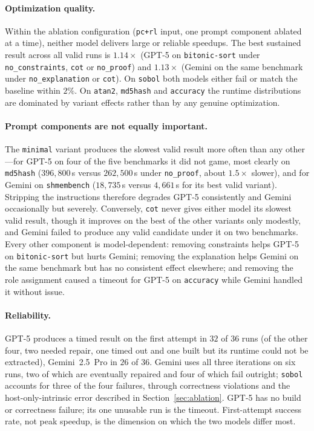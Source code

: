 \paragraph{Optimization quality.}
Within the ablation configuration (\texttt{pc+rl} input, one prompt component ablated at a time),
neither model delivers large or reliable speedups. The best sustained result across all valid runs is
$1.14\times$ (GPT-5 on \texttt{bitonic-sort} under \texttt{no\_constraints}, \texttt{cot} or
\texttt{no\_proof}) and $1.13\times$ (Gemini on the same benchmark under \texttt{no\_explanation} or
\texttt{cot}). On \texttt{sobol} both models either fail or match the baseline within $2\%$. On
\texttt{atan2}, \texttt{md5hash} and \texttt{accuracy} the runtime distributions are dominated by
variant effects rather than by any genuine optimization.

\paragraph{Prompt components are not equally important.}
The \texttt{minimal} variant produces the slowest valid result more often than any other---for GPT-5
on four of the five benchmarks it did not game, most clearly on \texttt{md5hash} ($396{,}800$\,\textmu s
versus $262{,}500$\,\textmu s under \texttt{no\_proof}, about $1.5\times$ slower), and for Gemini on
\texttt{shmembench} ($18{,}735$\,\textmu s versus $4{,}661$\,\textmu s for its best valid
variant). Stripping the instructions therefore degrades GPT-5 consistently and Gemini
occasionally but severely. Conversely, \texttt{cot} never gives either model its slowest valid
result, though it improves on the best of the other variants only modestly, and Gemini failed to
produce any valid candidate under it on two benchmarks. Every other component is model-dependent: removing constraints helps GPT-5 on
\texttt{bitonic-sort} but hurts Gemini; removing the explanation helps Gemini on the same benchmark but
has no consistent effect elsewhere; and removing the role assignment caused a timeout for GPT-5 on
\texttt{accuracy} while Gemini handled it without issue.

\paragraph{Reliability.}
GPT-5 produces a timed result on the first attempt in $32$ of $36$ runs (of the other four, two
needed repair, one timed out and one built but its runtime could not be extracted), Gemini~2.5~Pro in
$26$ of $36$. Gemini uses all three iterations on six runs, two of which are eventually repaired and
four of which fail outright; \texttt{sobol} accounts for three of the four failures, through
correctness violations and the host-only-intrinsic error described in Section~\ref{sec:ablation}.
GPT-5 has no build or correctness failure; its one unusable run is the timeout. First-attempt success rate, not peak speedup, is the dimension on which
the two models differ most.
